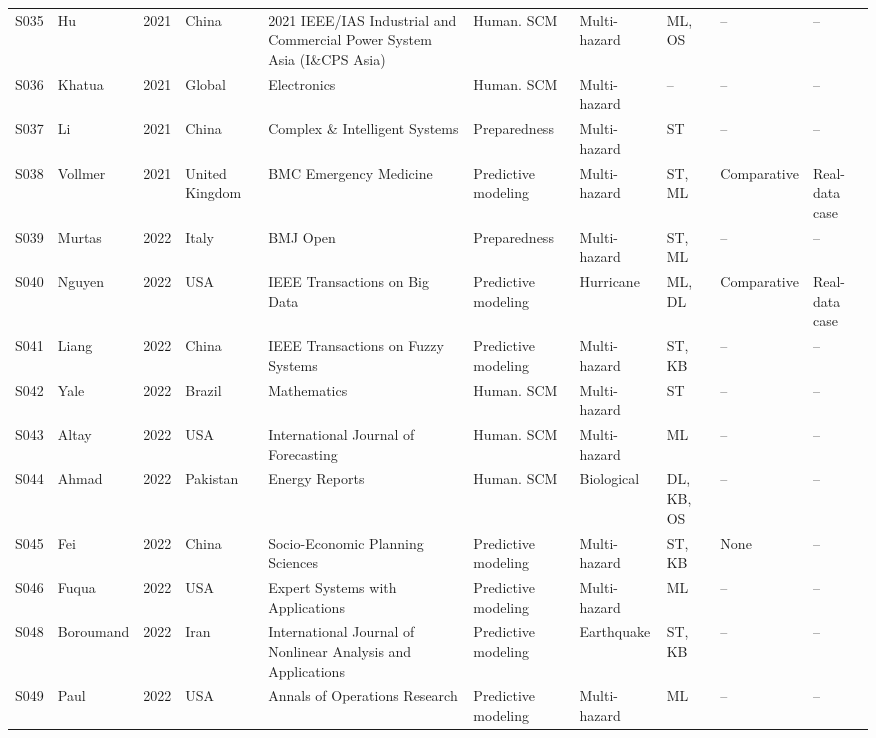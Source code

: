 \begin{landscape}
\begin{longtable}{@{}L{0.9cm}L{2.9cm}L{0.8cm}L{2.1cm}L{3.1cm}L{2.4cm}L{2.0cm}L{1.8cm}L{2.1cm}L{2.0cm}@{}}
S035 & Hu \cite{Hu2021PredictionDisasters} & 2021 & China & 2021 IEEE/IAS Industrial and Commercial Power System Asia (I\&CPS Asia) & Human. SCM & Multi-hazard & ML, OS & -- & -- \\
S036 & Khatua \cite{Khatua2021ArtificialForward} & 2021 & Global & Electronics & Human. SCM & Multi-hazard & -- & -- & -- \\
S037 & Li \cite{Jiang-ning2021ForecastingMethodology} & 2021 & China & Complex \& Intelligent Systems & Preparedness & Multi-hazard & ST & -- & -- \\
S038 & Vollmer \cite{Vollmer2021ADepartments} & 2021 & United Kingdom & BMC Emergency Medicine & Predictive modeling & Multi-hazard & ST, ML & Comparative & Real-data case \\
S039 & Murtas \cite{Murtas2022Time-seriesSystem} & 2022 & Italy & BMJ Open & Preparedness & Multi-hazard & ST, ML & -- & -- \\
S040 & Nguyen \cite{Nguyen2022ForecastingNetwork} & 2022 & USA & IEEE Transactions on Big Data & Predictive modeling & Hurricane & ML, DL & Comparative & Real-data case \\
S041 & Liang \cite{Liang2022Time-VaryingReasoning} & 2022 & China & IEEE Transactions on Fuzzy Systems & Predictive modeling & Multi-hazard & ST, KB & -- & -- \\
S042 & Yale \cite{Yale2022ABrazil} & 2022 & Brazil & Mathematics & Human. SCM & Multi-hazard & ST & -- & -- \\
S043 & Altay \cite{Altay2022ForecastingNeeds} & 2022 & USA & International Journal of Forecasting & Human. SCM & Multi-hazard & ML & -- & -- \\
S044 & Ahmad \cite{Ahmad2022Energetics4.0} & 2022 & Pakistan & Energy Reports & Human. SCM & Biological & DL, KB, OS & -- & -- \\
S045 & Fei \cite{Fei2022DemandTheory} & 2022 & China & Socio-Economic Planning Sciences & Predictive modeling & Multi-hazard & ST, KB & None & -- \\
S046 & Fuqua \cite{Fuqua2022CommodityPlanning} & 2022 & USA & Expert Systems with Applications & Predictive modeling & Multi-hazard & ML & -- & -- \\
S048 & Boroumand \cite{Boroumand2022AEarthquake} & 2022 & Iran & International Journal of Nonlinear Analysis and Applications & Predictive modeling & Earthquake & ST, KB & -- & -- \\
S049 & Paul \cite{Paul2022AnBehavior} & 2022 & USA & Annals of Operations Research & Predictive modeling & Multi-hazard & ML & -- & -- \\

\end{longtable}
\end{landscape}
